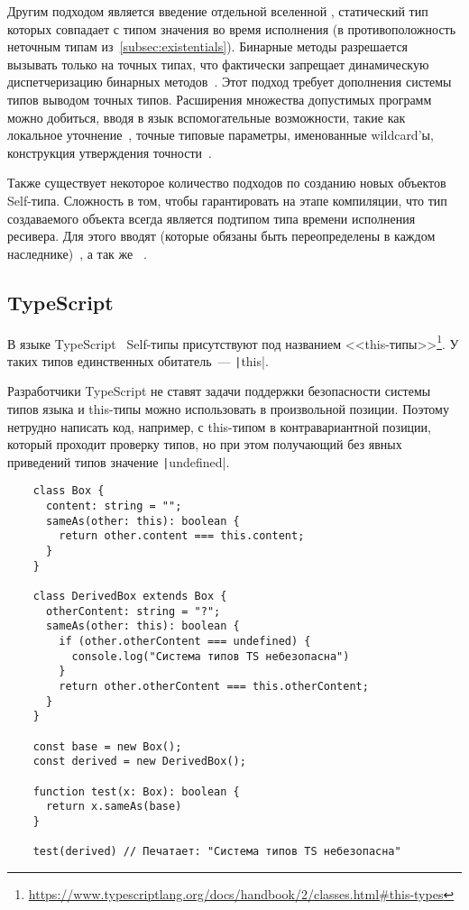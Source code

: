 Другим подходом является введение отдельной вселенной , статический тип которых совпадает с типом значения во время исполнения (в противоположность неточным типам из~\ref{subsec:existentials}).
Бинарные методы разрешается вызывать только на точных типах, что фактически запрещает динамическую диспетчеризацию бинарных методов~\cite{bruce1997increasing}.
Этот подход требует дополнения системы типов выводом точных типов.
Расширения множества допустимых программ можно добиться, вводя в язык вспомогательные возможности, такие как локальное уточнение~\cite{saito2009matching}, точные типовые параметры, именованные wildcard'ы, конструкция утверждения точности~\cite{ryu2016thistype}.

Также существует некоторое количество подходов по созданию новых объектов Self-типа.
Сложность в том, чтобы гарантировать на этапе компиляции, что тип создаваемого объекта всегда является подтипом типа времени исполнения ресивера.
Для этого вводят  (которые обязаны быть переопределены в каждом наследнике)~\cite{saito2009matching}, а так же ~\cite{ryu2016thistype}.


\subsection{TypeScript} \label{subsec:typescript}

В языке TypeScript~\cite{bierman2014understanding} Self-типы присутствуют под названием <<this-типы>>\footnote{\url{https://www.typescriptlang.org/docs/handbook/2/classes.html\#this-types}}.
У таких типов единственных обитатель~--- \texttt|this|.

Разработчики TypeScript не ставят задачи поддержки безопасности системы типов языка и this-типы можно использовать в произвольной позиции.
Поэтому нетрудно написать код, например, с this-типом в контравариантной позиции, который проходит проверку типов, но при этом получающий без явных приведений типов значение \texttt|undefined|.

\begin{verbatim}
    class Box {
      content: string = "";
      sameAs(other: this): boolean {
        return other.content === this.content;
      }
    }

    class DerivedBox extends Box {
      otherContent: string = "?";
      sameAs(other: this): boolean {
        if (other.otherContent === undefined) {
          console.log("Система типов TS небезопасна")
        }
        return other.otherContent === this.otherContent;
      }
    }

    const base = new Box();
    const derived = new DerivedBox();

    function test(x: Box): boolean {
      return x.sameAs(base)
    }

    test(derived) // Печатает: "Система типов TS небезопасна"
\end{verbatim}


